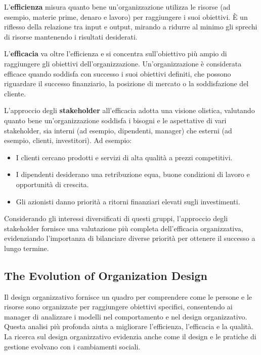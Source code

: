 \documentclass{article}
\begin{document}
    L'\textbf{efficienza} misura quanto bene un'organizzazione utilizza le risorse (ad esempio, materie prime, denaro e lavoro) per raggiungere i suoi obiettivi. È un riflesso della relazione tra input e output, mirando a ridurre al minimo gli sprechi di risorse mantenendo i risultati desiderati.
    
    L'\textbf{efficacia} va oltre l'efficienza e si concentra sull'obiettivo più ampio di raggiungere gli obiettivi dell'organizzazione. Un'organizzazione è considerata efficace quando soddisfa con successo i suoi obiettivi definiti, che possono riguardare il successo finanziario, la posizione di mercato o la soddisfazione del cliente.
    
    L'approccio degli \textbf{stakeholder} all'efficacia adotta una visione olistica, valutando quanto bene un'organizzazione soddisfa i bisogni e le aspettative di vari stakeholder, sia interni (ad esempio, dipendenti, manager) che esterni (ad esempio, clienti, investitori). Ad esempio:
    
    \begin{itemize}
        \item I clienti cercano prodotti e servizi di alta qualità a prezzi competitivi.
        \item I dipendenti desiderano una retribuzione equa, buone condizioni di lavoro e opportunità di crescita.
        \item Gli azionisti danno priorità a ritorni finanziari elevati sugli investimenti.
    \end{itemize}
    
    Considerando gli interessi diversificati di questi gruppi, l'approccio degli stakeholder fornisce una valutazione più completa dell'efficacia organizzativa, evidenziando l'importanza di bilanciare diverse priorità per ottenere il successo a lungo termine.
    
    \subsection{The Evolution of Organization Design}
Il design organizzativo fornisce un quadro per comprendere come le persone e le risorse sono organizzate per raggiungere obiettivi specifici, consentendo ai manager di analizzare i modelli nel comportamento e nel design organizzativo. Questa analisi più profonda aiuta a migliorare l'efficienza, l'efficacia e la qualità. La ricerca sul design organizzativo evidenzia anche come il design e le pratiche di gestione evolvano con i cambiamenti sociali.
\end{document}
